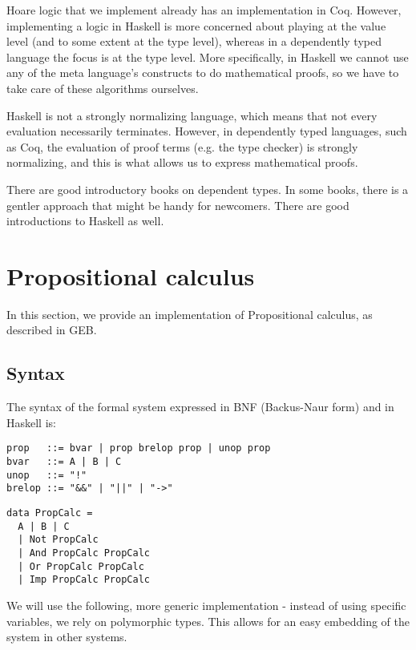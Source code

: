 \documentclass{article}
\begin{document}
Hoare logic that we implement already has an implementation in Coq\cite{b3}. However, implementing a logic in Haskell is more concerned about playing at the value level (and to some extent at the type level), whereas in a dependently typed language the focus is at the type level. More specifically, in Haskell we cannot use any of the meta language's constructs to do mathematical proofs, so we have to take care of these algorithms ourselves.

Haskell is not a strongly normalizing language, which means that not every evaluation necessarily terminates. However, in dependently typed languages, such as Coq\cite{b4}, the evaluation of proof terms (e.g. the type checker) is strongly normalizing, and this is what allows us to express mathematical proofs.

There are good introductory books on dependent types\cite{b3}. In some books, there is a gentler approach that might be handy for newcomers\cite{b5}. There are good introductions to Haskell as well\cite{b6}.

\section{Propositional calculus}

In this section, we provide an implementation of Propositional calculus, as described in GEB\cite{b7}.

\subsection{Syntax}

The syntax of the formal system expressed in BNF (Backus-Naur form) and in Haskell is:

\begin{minipage}{0.49\textwidth}
\begin{lstlisting}
prop   ::= bvar | prop brelop prop | unop prop
bvar   ::= A | B | C
unop   ::= "!"
brelop ::= "&&" | "||" | "->"
\end{lstlisting}
\end{minipage}
\begin{minipage}{0.49\textwidth}
\begin{lstlisting}
data PropCalc =
  A | B | C
  | Not PropCalc
  | And PropCalc PropCalc
  | Or PropCalc PropCalc
  | Imp PropCalc PropCalc
\end{lstlisting}
\end{minipage}

We will use the following, more generic implementation - instead of using specific variables, we rely on polymorphic types. This allows for an easy embedding of the system in other systems.
\end{document}
